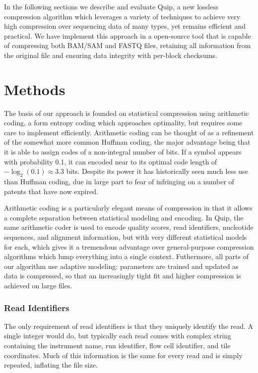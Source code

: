 \documentclass[twocolumn]{article}
\begin{document}

In the following sections we describe and evaluate Quip, a new lossless
compression algorithm which leverages a variety of techniques to achieve very
high compression over sequencing data of many types, yet remains efficient and
practical. We have implement this approach in a open-source tool that is
capable of compressing both BAM/SAM and FASTQ files, retaining all information
from the original file and ensuring data integrity with per-block checksums.



\section{Methods}

The basis of our approach is founded on statistical compression using
arithmetic coding, a form entropy coding which approaches optimality, but
requires some care to implement efficiently. Arithmetic coding can be thought
of as a refinement of the somewhat more common Huffman coding, the major
advantage being that it is able to assign codes of a non-integral number of
bits. If a symbol appears with probability 0.1, it can encoded near to its
optimal code length of $-\log_2(0.1) \approx 3.3$ bits. Despite its power it
has historically seen much less use than Huffman coding, due in large part to
fear of infringing on a number of patents that have now expired.

Arithmetic coding is a particularly elegant means of compression in that it
allows a complete separation between statistical modeling and encoding. In
Quip, the same arithmetic coder is used to encode quality scores, read
identifiers, nucleotide sequences, and alignment information, but with very
different statistical models for each, which gives it a tremendous advantage
over general-purpose compression algorithms which lump everything into a
single context. Futhermore, all parts of our algorithm use adaptive modeling:
parameters are trained and updated as data is compressed, so that an
increasingly tight fit and higher compression is achieved on large files.


\subsubsection{Read Identifiers}

The only requirement of read identifiers is that they uniquely identify the
read. A single integer would do, but typically each read comes with complex
string containing the instrument name, run identifier, flow cell identifier,
and tile coordinates. Much of this information is the same for every read and
is simply repeated, inflating the file size.
\end{document}

